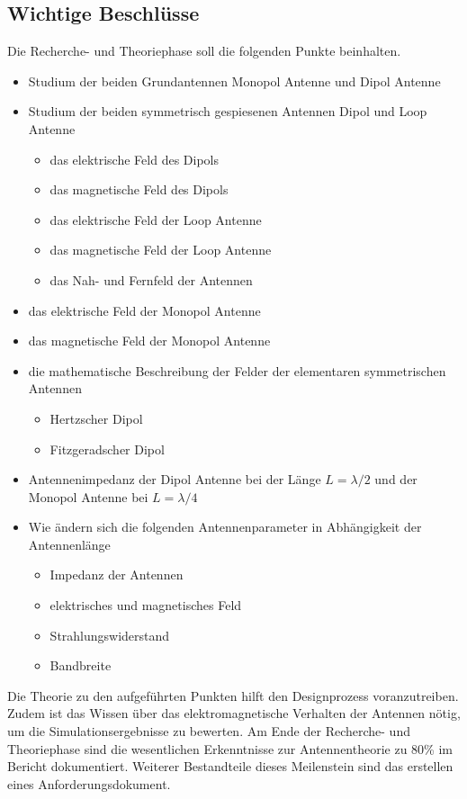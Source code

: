 \documentclass[10pt,a4paper]{report}
\begin{document}
\subsection{Wichtige Beschlüsse}
Die Recherche- und Theoriephase soll die folgenden Punkte beinhalten. 
\begin{itemize}
	\item Studium der beiden Grundantennen Monopol Antenne und Dipol Antenne
	\item Studium der beiden symmetrisch gespiesenen Antennen Dipol und Loop Antenne
	\begin{itemize}

		\item das elektrische Feld des Dipols
		\item das magnetische Feld des Dipols
		\item das elektrische Feld der Loop Antenne
		\item das magnetische Feld der Loop Antenne
		\item das Nah- und Fernfeld der Antennen
	\end{itemize}
		\item das elektrische Feld der Monopol Antenne
		\item das magnetische Feld der Monopol Antenne
		\item die mathematische Beschreibung der Felder der elementaren symmetrischen Antennen
		\begin{itemize}
		\item Hertzscher Dipol
		\item Fitzgeradscher Dipol
		\end{itemize}
		\item Antennenimpedanz der Dipol Antenne bei der Länge  $L=\lambda / 2$ und der Monopol Antenne bei $L=\lambda / 4$
		\item Wie ändern sich die folgenden Antennenparameter in Abhängigkeit der Antennenlänge 
	\begin{itemize}
		\item Impedanz der Antennen
		\item elektrisches und magnetisches Feld
		\item Strahlungswiderstand
		\item Bandbreite
	\end{itemize}
\end{itemize}
Die Theorie zu den aufgeführten Punkten hilft den Designprozess voranzutreiben. Zudem ist das Wissen über das elektromagnetische Verhalten der  Antennen nötig, um die Simulationsergebnisse zu bewerten. Am Ende der Recherche- und Theoriephase sind die wesentlichen Erkenntnisse zur Antennentheorie zu 80\% im Bericht dokumentiert. Weiterer Bestandteile dieses Meilenstein sind das erstellen  eines Anforderungsdokument. \\
\end{document}
